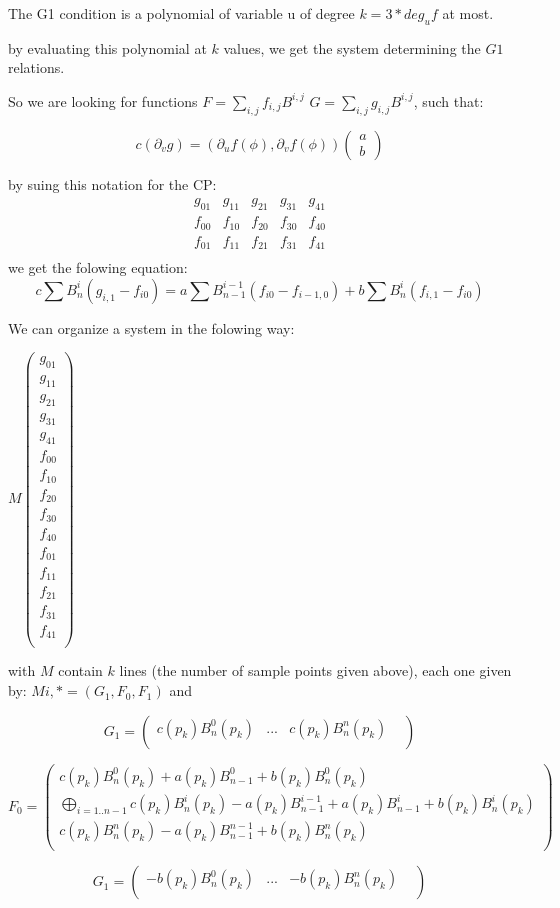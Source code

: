 \documentclass{article}
\begin{document}
The G1 condition is a polynomial of variable u of degree $k=3* deg_uf$ at most.

by evaluating this polynomial at $k$ values, we get the system determining the $G1$ relations.

So we are looking for functions $F=\sum_{i,j} f_{i,j}B^{i,j}$ $G=\sum_{i,j} g_{i,j}B^{i,j}$, such that:

$$c(\partial _v g)=(\partial _u f (\phi),\partial _v f (\phi)) \begin{pmatrix} a\\b\end{pmatrix}$$

by suing this notation for the CP:
$$\begin{matrix}
g_{01}&g_{11}&g_{21}&g_{31}&g_{41}\\
f_{00}&f_{10}&f_{20}&f_{30}&f_{40}\\
f_{01}&f_{11}&f_{21}&f_{31}&f_{41}\\
\end{matrix}
$$
we get the folowing equation:
$$c\sum B^i_n(g_{i,1}-f_{i0})=a\sum B^{i-1}_{n-1}(f_{i0}-f_{i-1,0})+b\sum B^i_n(f_{i,1}-f_{i0})$$

 We can organize a system in the folowing way:

$M
\begin{pmatrix}
g_{01}\\g_{11}\\g_{21}\\g_{31}\\g_{41}\\
f_{00}\\f_{10}\\f_{20}\\f_{30}\\f_{40}\\
f_{01}\\f_{11}\\f_{21}\\f_{31}\\f_{41}\\
\end{pmatrix}
$

with $M$ contain $k$ lines (the number of sample points given above), each one given by:
$M{i,*}=(G_1, F_0,F_1)$
and 

$$G_1=
\begin{pmatrix}
c(p_k)B^0_n(p_k)& ...& c(p_k)B^n_n(p_k)&\\
\end{pmatrix}$$

$$F_0=
\begin{pmatrix}
c(p_k)B^0_n(p_k)+a(p_k)B^{0}_{n-1}+b(p_k)B^0_n(p_k)\\
\bigoplus _{i=1..n-1}c(p_k)B^i_n(p_k)-a(p_k)B^{i-1}_{n-1}+a(p_k)B^{i}_{n-1}+b(p_k)B^i_n(p_k)\\
c(p_k)B^n_n(p_k)-a(p_k)B^{n-1}_{n-1}+b(p_k)B^n_n(p_k)\\
\end{pmatrix}
$$

$$G_1=
\begin{pmatrix}
-b(p_k)B^0_n(p_k)& ...& -b(p_k)B^n_n(p_k)&\\
\end{pmatrix}$$
\end{document}
